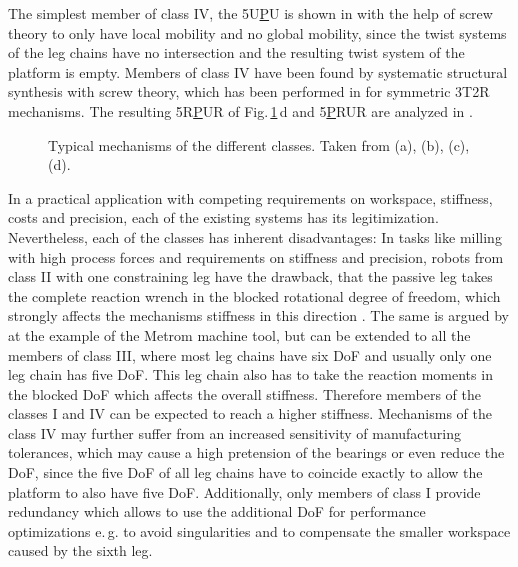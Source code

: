 \documentclass[robotics,article,submit,moreauthors,pdftex]{Definitions/mdpi}
\begin{document}
The simplest member of class IV, the 5U\underline{P}U is shown in \cite{HuangLi2002} with the help of screw theory to only have local mobility and no global mobility, since the twist systems of the leg chains have no intersection and the resulting twist system of the platform is empty.
Members of class IV have been found by systematic structural synthesis with screw theory, which has been performed in \cite{KongGos2005} for symmetric 3T2R mechanisms.
The resulting 5R\underline{P}UR of Fig.\,\ref{fig:systems_pictures}\,d and 5\underline{P}RUR are analyzed in \cite{Tale-MasoulehGos2011,Tale-MasoulehSaaGosTag2010}.
%
\begin{figure}[h!]
	
	\caption{Typical mechanisms of the different classes. Taken from \cite{ZhangGos2001} (a), \cite{MbarekNefCor2005} (b), \cite{AlaghebandMahMilBen2015} (c), \cite{Tale-MasoulehGos2011} (d).}
	\label{fig:systems_pictures}
	\vspace{-0.4cm}	%
\end{figure} 
\newpage
%
In a practical application with competing requirements on workspace, stiffness, costs and precision, each of the existing systems has its legitimization.
Nevertheless, each of the classes has inherent disadvantages:
In tasks like milling with high process forces and requirements on stiffness and precision, robots from class II with one constraining leg have the drawback, that the passive leg takes the complete reaction wrench in the blocked rotational degree of freedom, which strongly affects the mechanisms stiffness in this direction \cite{ZhangGos2001}.
The same is argued by \cite{LinLiYanZha2013} at the example of the Metrom machine tool, but can be extended to all the members of class III, where most leg chains have six DoF and usually only one leg chain has five DoF.
This leg chain also has to take the reaction moments in the blocked DoF which affects the overall stiffness.
Therefore members of the classes I and IV can be expected to reach a higher stiffness.
Mechanisms of the class IV may further suffer from an increased sensitivity of manufacturing tolerances, which may cause a high pretension of the bearings or even reduce the DoF, since the five DoF of all leg chains have to coincide exactly to allow the platform to also have five DoF.
Additionally, only members of class I provide redundancy which allows to use the additional DoF for performance optimizations e.\,g. to avoid singularities and to compensate the smaller workspace caused by the sixth leg.
\end{document}
